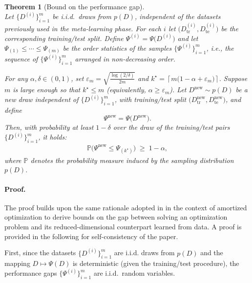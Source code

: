 \documentclass{article}
\newcommand{\tr}{\mathrm{tr}}
\newcommand{\te}{\mathrm{te}}
\newtheorem{theorem}{Theorem}
\begin{document}
\begin{theorem}[Bound on the performance gap]
\label{thm:val-gap}
\ \\
Let $\{D^{(i)}\}_{i=1}^m$ be i.i.d.\ draws from $p(D)$, independent of the datasets previously used in the meta-learning phase.
For each $i$ let $\bigl(D_\tr^{(i)}, D_\te^{(i)}\bigr)$ be the corresponding training/test split.
Define $\Psi^{(i)} = \Psi\!\bigl(D^{(i)}\bigr)$
and let $\Psi_{(1)} \le \cdots \le \Psi_{(m)}$ be the order statistics of the samples $\{\Psi^{(i)}\}_{i=1}^m$, i.e., the sequence of    $\{\Psi^{(i)}\}_{i=1}^m$ arranged in non-decreasing order.

For any $\alpha,\delta\in(0,1)$, set
$\varepsilon_m = \sqrt{\frac{\log(2/\delta)}{2m}}$ and
$k^\star = \left\lceil m\bigl(1-\alpha+\varepsilon_m\bigr)\right\rceil.$
Suppose $m$ is large enough so that $k^\star \le m$ (equivalently, $\alpha \ge \varepsilon_m$).
Let $D^{\mathrm{new}}\sim p(D)$ be a new  draw independent of  $\{D^{(i)}\}_{i=1}^m$, with training/test split
$\bigl(D_\tr^{\mathrm{new}}, D_\te^{\mathrm{new}}\bigr)$, and define
\begin{equation}
\Psi^{\mathrm{new}} = \Psi\!\bigl(D^{\mathrm{new}}\bigr).
\end{equation}
Then, with probability at least $1-\delta$ over the draw of the training/test pairs $\{D^{(i)}\}_{i=1}^m$, it holds:
\begin{align}
\mathbb{P}\bigl(\Psi^{\mathrm{new}} \le \Psi_{(k^\star)}  \bigr)
\;\ge\; 1-\alpha,
\label{eq:main-val-gap}
\end{align}
where $\mathbb{P}$ denotes the probability measure induced by the sampling distribution $p(D)$.
\end{theorem}

\paragraph*{Proof.}

The proof builds upon the same rationale   adopted in \cite[Section~4.2]{BuMe2025} in the context of amortized optimization
to derive  bounds on the gap between solving an optimization problem
and its reduced-dimensional counterpart learned from data.
A   proof is provided in the following for self-consistency  of the paper.

First, since the datasets $\{D^{(i)}\}_{i=1}^m$ are  i.i.d. draws from $p(D)$ and the mapping $D \mapsto \Psi(D)$ is deterministic (given the training/test procedure), the  performance gaps $\{\Psi^{(i)}\}_{i=1}^m$ are i.i.d.\ random variables.
\end{document}
